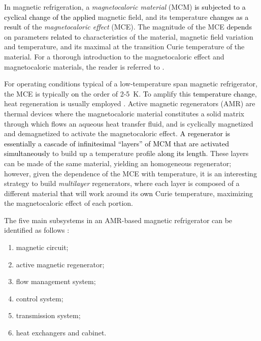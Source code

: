\documentclass[draft]{svjour3}
\begin{document}

In magnetic refrigeration, a \emph{magnetocaloric material} (MCM) \textcolor{black}{is subjected to a cyclical change of the applied} magnetic field, and its temperature \textcolor{black}{changes as a result} of the \emph{magnetocaloric effect} (MCE). The magnitude of the MCE  \textcolor{black}{depends} on  parameters \textcolor{black}{related to} characteristics of the material, magnetic field variation and temperature, and its maximal at the transition Curie temperature of the material. For a thorough introduction to the magnetocaloric effect and magnetocaloric materials, the reader is referred to \cite{bib:smith-magneto}.


For operating conditions typical of a low-temperature span magnetic refrigerator, the MCE is typically \textcolor{black}{on} the order of \num{2}-\SI{5}{\kelvin}. \textcolor{black}{T}o amplify this \textcolor{black}{temperature change}, heat regeneration is usually employed \cite{bib:kitanovski}. Active magnetic regenerators (AMR) are thermal devices where the magnetocaloric material constitutes a solid matrix through which flows an aqueous heat transfer fluid, and is cyclically magnetized and demagnetized to activate the magnetocaloric effect.  \textcolor{black}{A regenerator is essentially a cascade of infinitesimal ``layers'' of MCM that are activated simultaneously} to build up a temperature profile \textcolor{black}{along its length}. These layers can be made of the same material, yielding an homogeneous regenerator; however, given the  dependence  of the MCE with temperature, it is an interesting strategy to build \emph{multilayer} regenerators, where each layer is composed of a different material \textcolor{black}{that} will work around its \textcolor{black}{own} Curie temperature, maximizing the magnetocaloric effect of each portion.


The five main subsystems in an AMR-based magnetic refrigerator can be identified as follows \cite{bib:jaime,bib:trevizoli16_pump}:

\begin{enumerate}
\item magnetic circuit; \label{item:1}
\item active magnetic regenerator; \label{item:2}
\item flow management system; \label{item:3}
\item control system; \label{item:4}
\item transmission system; \label{item:5}
\item heat exchangers and cabinet. \label{item:6a}
\end{enumerate}
\end{document}
